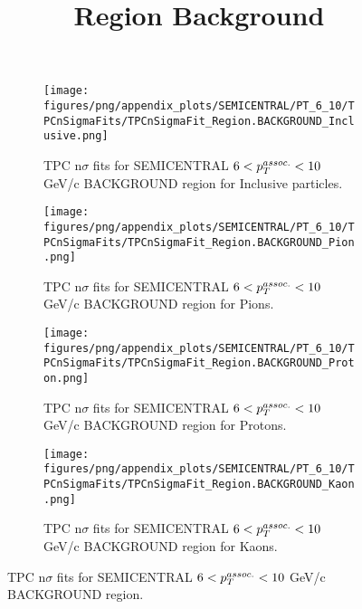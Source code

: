             \begin{figure}[H]
                \title{Region Background}
                \begin{subfigure}[b]{0.5\textwidth}
                    \centering
                    \texttt{[image: figures/png/appendix\_plots/SEMICENTRAL/PT\_6\_10/TPCnSigmaFits/TPCnSigmaFit\_Region.BACKGROUND\_Inclusive.png]}
                    \caption{TPC n$\sigma$ fits for SEMICENTRAL $6 < \pTassoc < 10$ GeV/c BACKGROUND region for Inclusive particles.}
                    \label{fig:appendix_SEMICENTRAL_$6 < \pTassoc < 10$ GeV/c_BACKGROUND_Inclusive}
                \end{subfigure}
                \begin{subfigure}[b]{0.5\textwidth}
                    \centering
                    \texttt{[image: figures/png/appendix\_plots/SEMICENTRAL/PT\_6\_10/TPCnSigmaFits/TPCnSigmaFit\_Region.BACKGROUND\_Pion.png]}
                    \caption{TPC n$\sigma$ fits for SEMICENTRAL $6 < \pTassoc < 10$ GeV/c BACKGROUND region for Pions.}
                    \label{fig:appendix_SEMICENTRAL_$6 < \pTassoc < 10$ GeV/c_BACKGROUND_Pion}
                \end{subfigure}
                \begin{subfigure}[b]{0.5\textwidth}
                    \centering
                    \texttt{[image: figures/png/appendix\_plots/SEMICENTRAL/PT\_6\_10/TPCnSigmaFits/TPCnSigmaFit\_Region.BACKGROUND\_Proton.png]}
                    \caption{TPC n$\sigma$ fits for SEMICENTRAL $6 < \pTassoc < 10$ GeV/c BACKGROUND region for Protons.}
                    \label{fig:appendix_SEMICENTRAL_$6 < \pTassoc < 10$ GeV/c_BACKGROUND_Proton}
                \end{subfigure}
                \begin{subfigure}[b]{0.5\textwidth}
                    \centering
                    \texttt{[image: figures/png/appendix\_plots/SEMICENTRAL/PT\_6\_10/TPCnSigmaFits/TPCnSigmaFit\_Region.BACKGROUND\_Kaon.png]}
                    \caption{TPC n$\sigma$ fits for SEMICENTRAL $6 < \pTassoc < 10$ GeV/c BACKGROUND region for Kaons.}
                    \label{fig:appendix_SEMICENTRAL_$6 < \pTassoc < 10$ GeV/c_BACKGROUND_Kaon}
                \end{subfigure}
                \caption{TPC n$\sigma$ fits for SEMICENTRAL $6 < \pTassoc < 10$ GeV/c BACKGROUND region.}
                \label{fig:appendix_SEMICENTRAL_$6 < \pTassoc < 10$ GeV/c_BACKGROUND}
            \end{figure}
            \clearpage
            
    